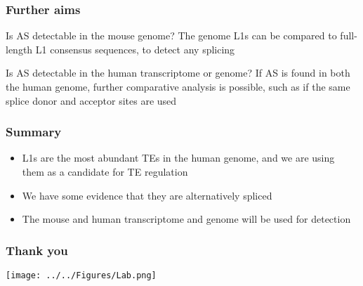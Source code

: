 \documentclass{beamer}
\begin{document}
		\begin{frame} %
			\frametitle{Further aims}
			
			\begin{block}{Is AS detectable in the mouse genome?}	
				The genome L1s can be compared to full-length L1 consensus sequences, to detect any splicing	
			\end{block}
			\begin{block}{Is AS detectable in the human transcriptome or genome?}	
				If AS is found in both the human genome, further comparative analysis is possible, such as if the same splice donor and acceptor sites are used
			\end{block}
			
		\end{frame}
		
		\begin{frame} %
			\frametitle{Summary}
			
			\begin{itemize}
				\item L1s are the most abundant TEs in the human genome, and we are using them as a candidate for TE regulation
				\item We have some evidence that they are alternatively spliced
				\item The mouse and human transcriptome and genome will be used for detection
			\end{itemize}
		\end{frame}
		
			\begin{frame}
				\frametitle{Thank you}
				\texttt{[image: ../../Figures/Lab.png]}
				
			\end{frame}
			
\end{document}
